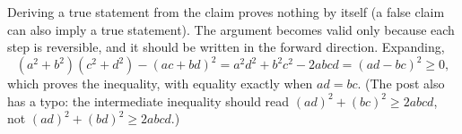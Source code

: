 Deriving a true statement from the claim proves nothing by itself (a false claim can also imply a true statement). The argument becomes valid only because each step is reversible, and it should be written in the forward direction. Expanding,
\[(a^2+b^2)(c^2+d^2)-(ac+bd)^2=a^2d^2+b^2c^2-2abcd=(ad-bc)^2\ge0,\]
which proves the inequality, with equality exactly when $ad=bc$. (The post also has a typo: the intermediate inequality should read $(ad)^2+(bc)^2\ge2abcd$, not $(ad)^2+(bd)^2\ge2abcd$.)
